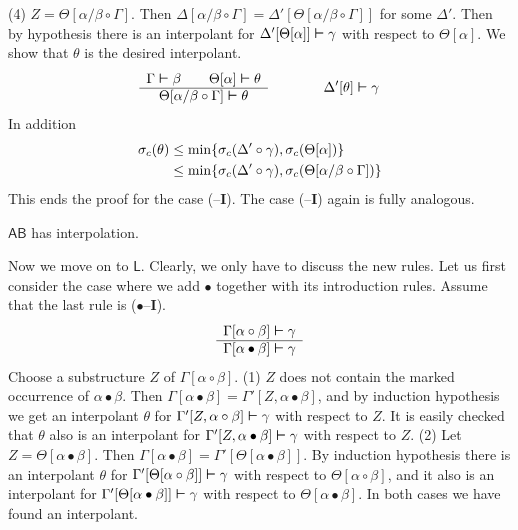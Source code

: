(4) $Z = \Theta[\alpha/\beta \circ \Gamma]$. Then $\Delta[\alpha/\beta
\circ \Gamma] = \Delta'[\Theta[\alpha/\beta \circ \Gamma]]$ for
some $\Delta'$. Then by hypothesis there is an interpolant for
$\Delta'[\Theta[\alpha]] \boldsymbol{\vdash} \gamma$ with respect to
$\Theta[\alpha]$. We show that $\theta$ is the desired
interpolant.
\begin{equation}
\begin{array}{c}
\Gamma \boldsymbol{\vdash} \beta \qquad \Theta[\alpha] \boldsymbol{\vdash} \theta \\\hline
\Theta[\alpha/\beta \circ \Gamma] \boldsymbol{\vdash} \theta
\end{array}
\qquad\qquad
\Delta'[\theta] \boldsymbol{\vdash} \gamma
\end{equation}
In addition 
\begin{align}
\sigma_c(\theta) & \leq  \min\{%
\sigma_c(\Delta' \circ \gamma), \sigma_c(\Theta[\alpha])\} \\\notag
	& \leq  \min\{\sigma_c(\Delta' \circ \gamma),
\sigma_c(\Theta[\alpha/\beta \circ \Gamma])\}
\end{align} 
This ends the proof for the case ({\mtt{\tf}}--\textbf{I}). The case 
({\mtt{\tb}}--\textbf{I}) again is fully analogous.
\begin{thm}
$\mathsf{AB}$ has interpolation.
\proofend
\end{thm}
Now we move on to $\mathsf{L}$. Clearly, we only have to discuss the
new rules. Let us first consider the case where we add $\bullet$ 
together with its introduction rules. Assume that the last rule is 
($\bullet$--\textbf{I}).
\begin{equation}
\begin{array}{c}
\Gamma[\alpha \circ \beta] \boldsymbol{\vdash} \gamma \\\hline
\Gamma[\alpha \bullet \beta] \boldsymbol{\vdash} \gamma
\end{array}
\end{equation}
Choose a substructure $Z$ of $\Gamma[\alpha \circ \beta]$.
(1) $Z$ does not contain the marked occurrence of  $\alpha
\bullet \beta$. Then $\Gamma[\alpha \bullet \beta]
= \Gamma'[Z, \alpha \bullet \beta]$, and by induction hypothesis
we get an interpolant $\theta$ for $\Gamma'[Z, \alpha \circ \beta]
\boldsymbol{\vdash} \gamma$ with respect to $Z$. It is easily checked that
$\theta$ also is an interpolant for $\Gamma'[Z, \alpha \bullet \beta] %
\bvdash \gamma$ with respect to $Z$.
(2) Let $Z = \Theta[\alpha \bullet \beta]$. Then
$\Gamma[\alpha \bullet \beta] = \Gamma'[\Theta[\alpha \bullet
\beta]]$. By induction hypothesis there is an interpolant $\theta$
for $\Gamma'[\Theta[\alpha \circ \beta]] \boldsymbol{\vdash} \gamma$ with respect
to $\Theta[\alpha \circ \beta]$, and it also is an interpolant for
$\Gamma'[\Theta[\alpha \bullet \beta]] \boldsymbol{\vdash} \gamma$
with respect to $\Theta[\alpha \bullet \beta]$.
In both cases we have found an interpolant.

